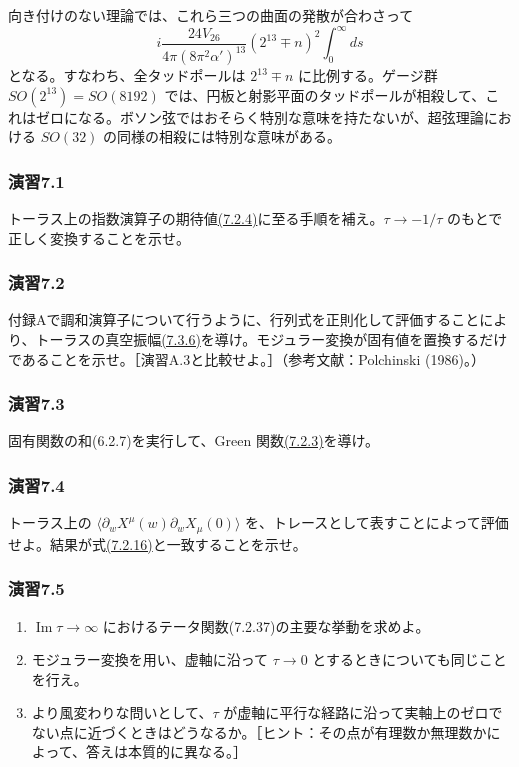 向き付けのない理論では、これら三つの曲面の発散が合わさって
\begin{equation}
i\frac{24V_{26}}{4\pi(8\pi^2\alpha')^{13}}
(2^{13}\mp n)^2\int_0^\infty ds
\tag{7.4.24}\label{eq:7.4.24}
\end{equation}
となる。すなわち、全タッドポールは $2^{13}\mp n$ に比例する。ゲージ群 $SO(2^{13})=SO(8192)$ では、円板と射影平面のタッドポールが相殺して、これはゼロになる。ボソン弦ではおそらく特別な意味を持たないが、超弦理論における $SO(32)$ の同様の相殺には特別な意味がある。


\subsubsection*{演習7.1}\label{ex:7.1}
トーラス上の指数演算子の期待値\hyperref[eq:7.2.4]{(7.2.4)}に至る手順を補え。$\tau\to-1/\tau$ のもとで正しく変換することを示せ。

\subsubsection*{演習7.2}\label{ex:7.2}
付録Aで調和演算子について行うように、行列式を正則化して評価することにより、トーラスの真空振幅\hyperref[eq:7.3.6]{(7.3.6)}を導け。モジュラー変換が固有値を置換するだけであることを示せ。［演習A.3と比較せよ。］（参考文献：Polchinski (1986)。）

\subsubsection*{演習7.3}\label{ex:7.3}
固有関数の和(6.2.7)を実行して、Green 関数\hyperref[eq:7.2.3]{(7.2.3)}を導け。

\subsubsection*{演習7.4}\label{ex:7.4}
トーラス上の $\langle\partial_wX^\mu(w)\partial_wX_\mu(0)\rangle$ を、トレースとして表すことによって評価せよ。結果が式\hyperref[eq:7.2.16]{(7.2.16)}と一致することを示せ。

\subsubsection*{演習7.5}\label{ex:7.5}
\begin{enumerate}
\item[(a)] $\operatorname{Im}\tau\to\infty$ におけるテータ関数(7.2.37)の主要な挙動を求めよ。
\item[(b)] モジュラー変換を用い、虚軸に沿って $\tau\to0$ とするときについても同じことを行え。
\item[(c)] より風変わりな問いとして、$\tau$ が虚軸に平行な経路に沿って実軸上のゼロでない点に近づくときはどうなるか。［ヒント：その点が有理数か無理数かによって、答えは本質的に異なる。］
\end{enumerate}

